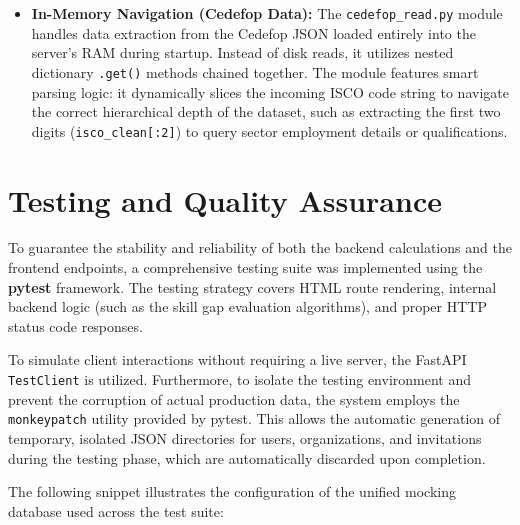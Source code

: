 \documentclass{article}
\begin{document}
\begin{itemize}
    \item \textbf{In-Memory Navigation (Cedefop Data):} The \texttt{cedefop\_read.py} 
    module handles data extraction from the Cedefop JSON loaded entirely into the 
    server's RAM during startup. Instead of disk reads, it utilizes nested 
    dictionary \texttt{.get()} methods chained together. The module features 
    smart parsing logic: it dynamically slices the incoming ISCO code string 
    to navigate the correct hierarchical depth of the dataset, such as extracting 
    the first two digits (\texttt{isco\_clean[:2]}) to query sector employment 
    details or qualifications.
\end{itemize}

\newpage

\section{Testing and Quality Assurance}
To guarantee the stability and reliability of both the backend calculations and the 
frontend endpoints, a comprehensive testing suite was implemented using the 
\textbf{pytest} framework. The testing strategy covers HTML route rendering, 
internal backend logic (such as the skill gap evaluation algorithms), and proper 
HTTP status code responses.

To simulate client interactions without requiring a live server, the FastAPI 
\texttt{TestClient} is utilized. Furthermore, to isolate the testing environment 
and prevent the corruption of actual production data, the system employs the 
\mbox{\texttt{monkeypatch}} utility provided by pytest. This allows the automatic 
generation of temporary, isolated JSON directories for users, organizations, 
and invitations during the testing phase, which are automatically 
discarded upon completion. 

The following snippet illustrates the configuration of the unified mocking database 
used across the test suite:
\end{document}
